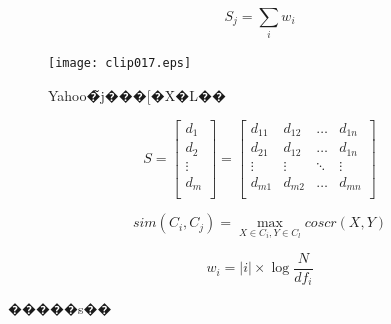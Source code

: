 \begin{equation}
\label{weight_equation}
S_j=\sum_{i}w_i
\end{equation}

\begin{figure}[h]
  \begin{center}
    \texttt{[image: clip017.eps]}
  \end{center}
  \caption{Yahoo�̃j���[�X�L��}%
  \label{fig:clip017.eps}
\end{figure}


\begin{equation}
\label{trem_matrix}
S=\left[
  \begin{array}{c}
    d_{1}   \\ d_{2}   \\ \vdots   \\ d_{m}   \\
  \end{array}
\right]
=
\left[
  \begin{array}{cccc}
    d_{11}   & d_{12}   & \ldots  & d_{1n}   \\
    d_{21}   & d_{12}   & \ldots  & d_{1n}   \\
    \vdots   & \vdots   & \ddots  & \vdots   \\
    d_{m1}   & d_{m2}   & \ldots   & d_{mn}   \\
  \end{array}
\right]
\end{equation}

\begin{equation}
\label{min_dis}
sim\left( C_i, C_j\right)
=\displaystyle\max_{X\in C_i,Y\in C_l}coscr\left( X,Y\right)
\end{equation}

\begin{equation}
\label{term_chain}
w_i=\left| i\right|\times\log\frac{N}{df_i}
\end{equation}

\begin{table}[htbp]
\begin{center}
\begin{tabular}{|c|c|c|} \hline
\hline
\hline
\hline
\end{tabular}
\end{center}
\caption{�����s��}
\label{kousa}
\end{table}
